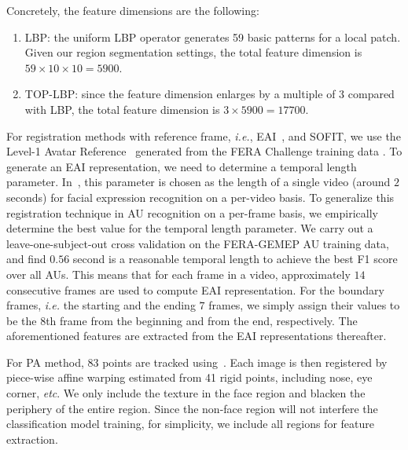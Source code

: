 \documentclass[10pt,journal]{IEEEtran}
\begin{document}
Concretely, the feature dimensions are the following:
\begin{enumerate}
\item LBP: the uniform LBP operator generates 59 basic patterns for a local patch. Given our region segmentation settings, the total feature dimension is $59\times 10\times 10=5900$. 
\item TOP-LBP: since the feature dimension enlarges by a multiple of $3$ compared with LBP, the total feature dimension is $3\times 5900=17700$.
\end{enumerate} 



For registration methods with reference frame, \textit{i.e.}, EAI~\cite{Yang_SMCB12}, and SOFIT, we use the Level-1 Avatar Reference~\cite{Yang_SMCB12} generated from the FERA Challenge training data \cite{FERA11}. To generate an EAI representation, we need to determine a temporal length parameter. In~\cite{Yang_SMCB12}, this parameter is chosen as the length of a single video (around $2$ seconds) for facial expression recognition on a per-video basis. To generalize this registration technique in AU recognition on a per-frame basis, we empirically determine the best value for the temporal length parameter. We carry out a leave-one-subject-out cross validation on the FERA-GEMEP AU training data, and find $0.56$ second is a reasonable temporal length to achieve the best F1 score over all AUs. This means that for each frame in a video, approximately $14$ consecutive frames are used to compute EAI representation. For the boundary frames, \textit{i.e.} the starting and the ending $7$ frames, we simply assign their values to be the $8$th frame from the beginning and from the end, respectively. The aforementioned features are extracted from the EAI representations thereafter.

For PA method, 83 points are tracked using~\cite{Tadas_ECCV14}. Each image is then registered by piece-wise affine warping estimated from 41 rigid points, including nose, eye corner, \textit{etc}. We only include the texture in the face region and blacken the periphery of the entire region. Since the non-face region will not interfere the classification model training, for simplicity, we include all regions for feature extraction.  
\end{document}
